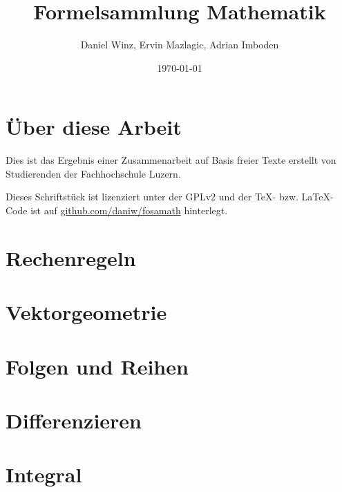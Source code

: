 \documentclass[a5paper,10pt,fleqn]{book}
\title{Formelsammlung Mathematik}
\author{Daniel Winz, Ervin Mazlagic, Adrian Imboden}
\date{\today}
\begin{document}
\maketitle

\chapter*{Über diese Arbeit}
Dies ist das Ergebnis einer Zusammenarbeit auf Basis freier Texte erstellt von Studierenden der Fachhochschule Luzern. 

Dieses Schriftstück ist lizenziert unter der GPLv2 und der \TeX-  bzw. \LaTeX- Code ist auf \url{github.com/daniw/fosamath} hinterlegt.


\tableofcontents

\chapter{Rechenregeln}


\chapter{Vektorgeometrie}


\chapter{Folgen und Reihen}



\chapter{Differenzieren}




\chapter{Integral}



\end{document}
